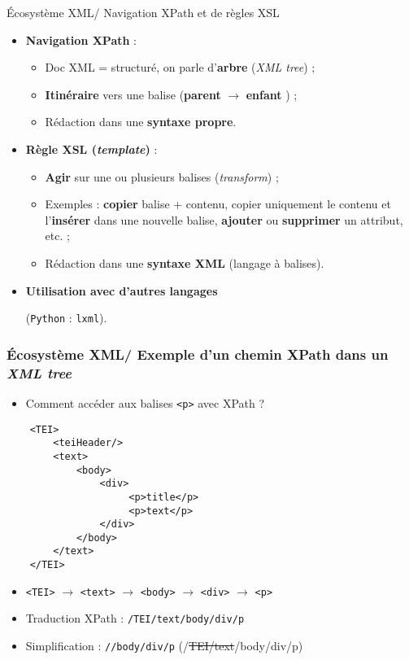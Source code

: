 \documentclass{beamer}
\begin{document}
  \begin{frame}{Écosystème XML/ Navigation XPath et de règles XSL}
  \Large
  \begin{itemize}
      \item \textbf{Navigation XPath} :
      \begin{itemize}
          \item Doc XML = structuré, on parle d'\og \textbf{arbre} \fg{} (\textit{XML tree}) ; 
          \item \textbf{Itinéraire} vers une balise (\og \textbf{parent} \fg{} $\rightarrow$ \og \textbf{enfant} \fg{}) ;
          \item Rédaction dans une \textbf{syntaxe propre}. %
      \end{itemize}
      \bigskip
      \item \textbf{Règle XSL (\textit{template})} :
      \begin{itemize}
          \item \textbf{Agir} sur une ou plusieurs balises (\textit{transform}) ;
          \item Exemples : \textbf{copier} balise + contenu, copier uniquement le contenu et l'\textbf{insérer} dans une nouvelle balise, \textbf{ajouter} ou \textbf{supprimer} un attribut, etc. ;
          \item Rédaction dans une \textbf{syntaxe XML} (langage à balises).
      \end{itemize}
      \bigskip
      \item \textbf{Utilisation avec d'autres langages}
      
      \normalsize (\texttt{Python} :  \texttt{lxml}).
  \end{itemize}
   
  \end{frame}
  
\begin{frame}[fragile]
\frametitle{Écosystème XML/ Exemple d'un chemin XPath dans un \textit{XML tree}}
\begin{itemize}
    \item Comment accéder aux balises \texttt{<p>} avec XPath ?
\end{itemize}
\small
\begin{verbatim}
    <TEI>
        <teiHeader/>
        <text>
            <body>
                <div>
                     <p>title</p>
                     <p>text</p>
                </div>
            </body>
        </text>
    </TEI>
\end{verbatim}
\normalsize
\begin{itemize}
          \item \texttt{<TEI>} $\rightarrow$ \texttt{<text>} $\rightarrow$ \texttt{<body>} $\rightarrow$ \texttt{<div>} $\rightarrow$ \texttt{<p>}
          \item Traduction XPath : \texttt{/TEI/text/body/div/p}
          \item Simplification : \texttt{//body/div/p} (/\sout{TEI/text}/body/div/p)
      \end{itemize}
\end{frame}
  
\end{document}
